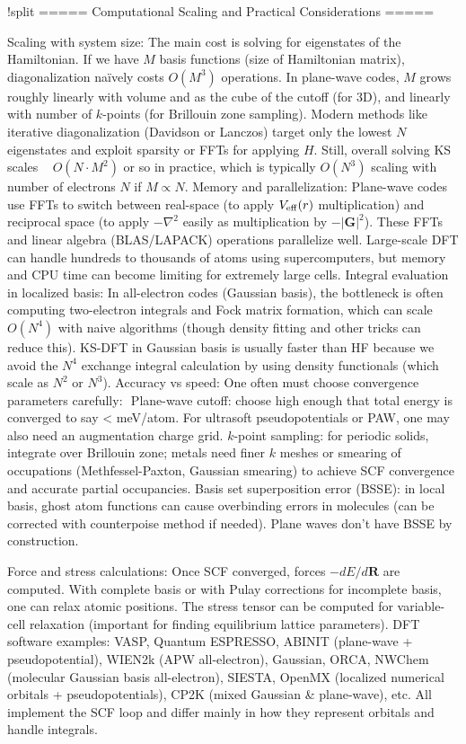 !split
===== Computational Scaling and Practical Considerations =====

Scaling with system size: The main cost is solving for eigenstates of the Hamiltonian. If we have $M$ basis functions (size of Hamiltonian matrix), diagonalization naïvely costs $O(M^3)$ operations. In plane-wave codes, $M$ grows roughly linearly with volume and as the cube of the cutoff (for 3D), and linearly with number of $k$-points (for Brillouin zone sampling). Modern methods like iterative diagonalization (Davidson or Lanczos) target only the lowest $N$ eigenstates and exploit sparsity or FFTs for applying $H$. Still, overall solving KS scales ~ $O(N \cdot M^2)$ or so in practice, which is typically $O(N^3)$ scaling with number of electrons $N$ if $M \propto N$.
Memory and parallelization: Plane-wave codes use FFTs to switch between real-space (to apply $V_{\rm eff}(r)$ multiplication) and reciprocal space (to apply $-\nabla^2$ easily as multiplication by $-|\mathbf{G}|^2$). These FFTs and linear algebra (BLAS/LAPACK) operations parallelize well. Large-scale DFT can handle hundreds to thousands of atoms using supercomputers, but memory and CPU time can become limiting for extremely large cells.
Integral evaluation in localized basis: In all-electron codes (Gaussian basis), the bottleneck is often computing two-electron integrals and Fock matrix formation, which can scale $O(N^4)$ with naive algorithms (though density fitting and other tricks can reduce this). KS-DFT in Gaussian basis is usually faster than HF because we avoid the $N^4$ exchange integral calculation by using density functionals (which scale as $N^2$ or $N^3$).
Accuracy vs speed: One often must choose convergence parameters carefully: 
Plane-wave cutoff: choose high enough that total energy is converged to say < meV/atom. For ultrasoft pseudopotentials or PAW, one may also need an augmentation charge grid.
$k$-point sampling: for periodic solids, integrate over Brillouin zone; metals need finer $k$ meshes or smearing of occupations (Methfessel-Paxton, Gaussian smearing) to achieve SCF convergence and accurate partial occupancies.
Basis set superposition error (BSSE): in local basis, ghost atom functions can cause overbinding errors in molecules (can be corrected with counterpoise method if needed). Plane waves don’t have BSSE by construction.

Force and stress calculations: Once SCF converged, forces $-dE/d\mathbf{R}$ are computed. With complete basis or with Pulay corrections for incomplete basis, one can relax atomic positions. The stress tensor can be computed for variable-cell relaxation (important for finding equilibrium lattice parameters).
DFT software examples: VASP, Quantum ESPRESSO, ABINIT (plane-wave + pseudopotential), WIEN2k (APW all-electron), Gaussian, ORCA, NWChem (molecular Gaussian basis all-electron), SIESTA, OpenMX (localized numerical orbitals + pseudopotentials), CP2K (mixed Gaussian & plane-wave), etc. All implement the SCF loop and differ mainly in how they represent orbitals and handle integrals. 


